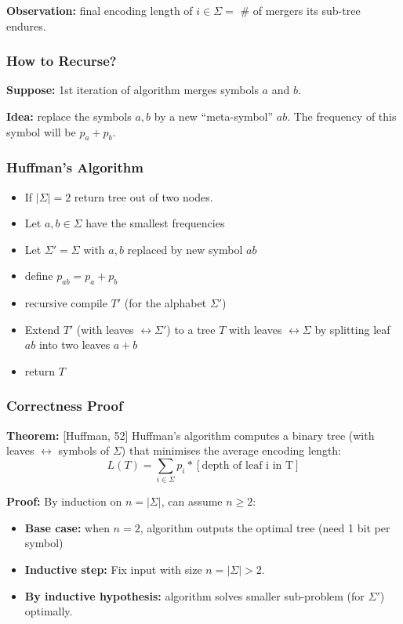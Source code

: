 \documentclass{scrartcl}
\begin{document}
{\bf Observation: } final encoding length of $i \in \Sigma = $ \# of mergers its
sub-tree endures.

\subsubsection{How to Recurse?}
\label{sec:7-3-2}

{\bf Suppose: } 1st iteration of algorithm merges symbols $a$ and $b$.

{\bf Idea: } replace the symbols $a,b$ by a new ``meta-symbol'' $ab$. The
frequency of this symbol will be $p_a + p_b$.

\subsubsection{Huffman's Algorithm }
\label{sec:7-3-3}

\begin{itemize}
\item If $|\Sigma| = 2$ return tree out of two nodes.
\item Let $a, b \in \Sigma$ have the smallest frequencies
\item Let $\Sigma' = \Sigma$ with $a, b$ replaced by new symbol $ab$
\item define $p_{ab} = p_a + p_b$
\item recursive compile $T'$ (for the alphabet $\Sigma'$)
\item Extend $T'$ (with leaves $\leftrightarrow \Sigma'$) to a tree $T$ with
  leaves $\leftrightarrow \Sigma$ by splitting leaf $ab$ into two leaves $a + b$
\item return $T$
\end{itemize}

\subsubsection{Correctness Proof}
\label{sec:7-4} {\bf Theorem: }[Huffman, 52] Huffman's algorithm computes a
binary tree (with leaves $\leftrightarrow$ symbols of $\Sigma$) that minimises
the average encoding length:
$$ L(T) = \sum_{i \in \Sigma} p_i * [\text{depth of leaf i in T}]$$ 

{\bf Proof: } By induction on $n = |\Sigma|$, can assume $n \geq 2$:
\begin{itemize}
\item {\bf Base case: } when $n = 2$, algorithm outputs the optimal tree (need 1
  bit per symbol)
\item {\bf Inductive step: } Fix input with size $n = |\Sigma| > 2$.
\item {\bf By inductive hypothesis: } algorithm solves smaller sub-problem (for
  $\Sigma '$) optimally.
\end{itemize}
\end{document}
